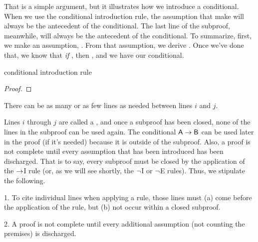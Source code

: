 That is a simple argument, but it illustrates how we introduce a conditional. When we use the conditional introduction rule, the assumption that make will always be the antecedent of the conditional. The last line of the subproof, meanwhile, will always be the antecedent of the conditional. 
To summarize, first, we make an assumption, . From that assumption, we derive . Once we've done that, we know that \textit{if} , then , and we have our conditional. 
\begin{factboxy}{conditional introduction rule}
	\begin{proof}
		\open
			 \as{}
		\close
	\end{proof}
\footnotesize{There can be as many or as few lines as needed between lines $i$ and $j$.} 
\end{factboxy}

Lines $i$ through $j$ are called a , and once a subproof has been closed, none of the lines in the subproof can be used again. The conditional $\mathsf{A}\rightarrow\mathsf{B}$ can be used later in the proof (if it's needed) because it is outside of the subproof. Also, a proof is not complete until every assumption that has been introduced has been discharged. That is to say, every subproof must be closed by the application of the $\rightarrow$I rule (or, as we will see shortly, the ${\neg}$I or ${\neg}$E rules).
Thus, we stipulate the following.
\begin{earg}
\item[1.] To cite individual lines when applying a rule, those lines must (a) come before the application of the rule, but (b) not occur within a closed subproof.
\item[2.] A proof is not complete until every additional assumption (not counting the premises) is discharged.
\end{earg}

